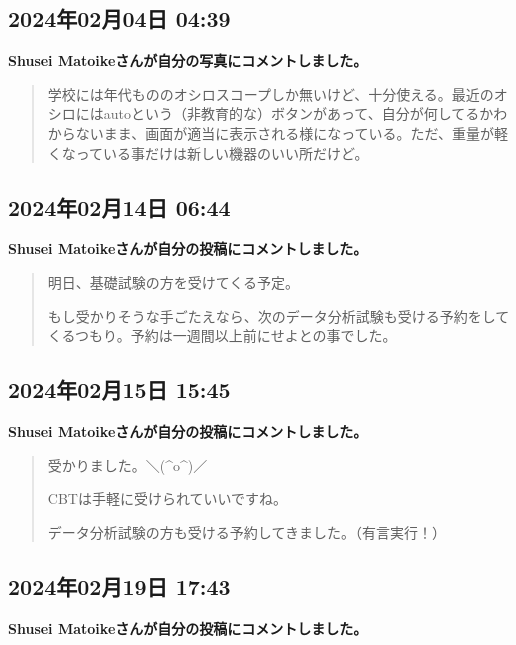 \subsection*{2024年02月04日 04:39}

\textbf{Shusei Matoikeさんが自分の写真にコメントしました。}

\begin{quote}
学校には年代もののオシロスコープしか無いけど、十分使える。最近のオシロにはautoという（非教育的な）ボタンがあって、自分が何してるかわからないまま、画面が適当に表示される様になっている。ただ、重量が軽くなっている事だけは新しい機器のいい所だけど。
\end{quote}

\subsection*{2024年02月14日 06:44}

\textbf{Shusei Matoikeさんが自分の投稿にコメントしました。}

\begin{quote}
明日、基礎試験の方を受けてくる予定。

もし受かりそうな手ごたえなら、次のデータ分析試験も受ける予約をしてくるつもり。予約は一週間以上前にせよとの事でした。
\end{quote}

\subsection*{2024年02月15日 15:45}

\textbf{Shusei Matoikeさんが自分の投稿にコメントしました。}

\begin{quote}
受かりました。＼(\textasciicircum{}o\textasciicircum{})／

CBTは手軽に受けられていいですね。

データ分析試験の方も受ける予約してきました。（有言実行！）
\end{quote}

\subsection*{2024年02月19日 17:43}

\textbf{Shusei Matoikeさんが自分の投稿にコメントしました。}

